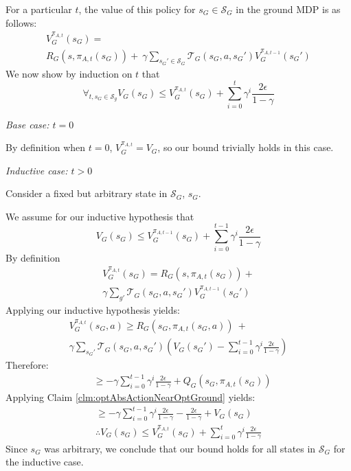 For a particular $t$, the value of this policy for $s_G \in \mathcal{S}_G$ in the ground \ac{MDP} is as follows:
\begin{multline*}
V_G^{\pi_{A,t}}(s_G) = \\
R_G(s, \pi_{A,t}(s_G)) +\ \gamma \sum_{{s_G}' \in \mathcal{S}_G}\mathcal{T}_G(s_G, a, {s_G}')V_G^{\pi_{A,t-1}}({s_G}')
\end{multline*}
We now show by induction on $t$ that
\begin{equation}
\forall_{t, s_G \in \mathcal{S}_g} V_G(s_G) \leq  V_G^{\pi_{A,t}}(s_G) + \sum_{i=0}^{t}\gamma^i \frac{2\epsilon}{1-\gamma}
\end{equation}

\textit{Base case: $t=0$}

By definition when $t=0$, $V_G^{\pi_{A,t}} = V_G$, so our bound trivially holds in this case.

\textit{Inductive case: $t > 0$}

Consider a fixed but arbitrary state in $\mathcal{S}_G$, $s_G$.

We assume for our inductive hypothesis that
\begin{equation}
V_G(s_G) \leq V_G^{\pi_{A,t-1}}(s_G) + \sum_{i=0}^{t-1}\gamma^i \frac{2\epsilon}{1-\gamma}
\end{equation}
By definition 
\begin{multline*}
V_G^{\pi_{A,t}}(s_G) = R_G(s, \pi_{A,t}(s_G)) + \\ \gamma \sum_{g'}\mathcal{T}_G(s_G, a, {s_G}')V_G^{\pi_{A,t-1}}({s_G}')
\end{multline*}
Applying our inductive hypothesis yields:
\begin{multline*}
V_G^{\pi_{A,t}}(s_G, a) \geq R_G(s_G, \pi_{A,t}(s_G, a))\ + \\ \gamma \sum_{{s_G}'}\mathcal{T}_G(s_G, a, {s_G}')\left(V_G({s_G}') - \sum_{i=0}^{t-1}\gamma^i \frac{2\epsilon}{1-\gamma} \right)
\end{multline*}
Therefore:
\begin{align*}
&\geq -\gamma\sum_{i=0}^{t-1}\gamma^i \frac{2\epsilon}{1-\gamma} + Q_G(s_G, \pi_{A,t} (s_G))
\end{align*}
Applying Claim \ref{clm:optAbsActionNearOptGround} yields:
\begin{align*}
\geq -\gamma\sum_{i=0}^{t-1}\gamma^i \frac{2\epsilon}{1-\gamma} - \frac{2\epsilon}{1-\gamma} + V_{G}(s_G) \\
\therefore V_G(s_G) \leq V_G^{\pi_{A,t}}(s_G)  + \sum_{i=0}^{t}\gamma^i \frac{2\epsilon}{1-\gamma}
\end{align*}
Since $s_G$ was arbitrary, we conclude that our bound holds for all states in $\mathcal{S}_G$ for the inductive case.

